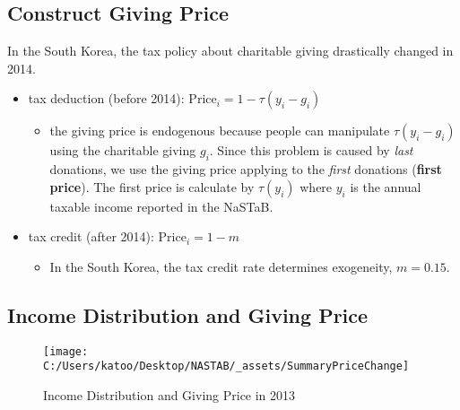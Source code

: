 \documentclass[ review  , 3p ]{elsarticle}
\providecommand{\tightlist}{%
  \setlength{\itemsep}{0pt}\setlength{\parskip}{0pt}}
\begin{document}
  \hypertarget{construct-giving-price}{%
  \subsection{Construct Giving Price}\label{construct-giving-price}}

  In the South Korea, the tax policy about charitable giving drastically changed in 2014.

  \begin{itemize}
  \tightlist
  \item
    tax deduction (before 2014): \(\text{Price}_i = 1 - \tau(y_i - g_i)\)

    \begin{itemize}
    \tightlist
    \item
      the giving price is endogenous because people can manipulate \(\tau(y_i - g_i)\) using the charitable giving \(g_i\). Since this problem is caused by \emph{last} donations, we use the giving price applying to the \emph{first} donations (\textbf{first price}). The first price is calculate by \(\tau(y_i)\) where \(y_i\) is the annual taxable income reported in the NaSTaB.
    \end{itemize}
  \item
    tax credit (after 2014): \(\text{Price}_i = 1 - m\)

    \begin{itemize}
    \tightlist
    \item
      In the South Korea, the tax credit rate determines exogeneity, \(m = 0.15\).
    \end{itemize}
  \end{itemize}

  \hypertarget{income-distribution-and-giving-price}{%
  \subsection{Income Distribution and Giving Price}\label{income-distribution-and-giving-price}}

  \begin{figure}

  {\centering \texttt{[image: C:/Users/katoo/Desktop/NASTAB/\_assets/SummaryPriceChange]} 

  }

  \caption{Income Distribution and Giving Price in 2013}\label{fig:unnamed-chunk-2}
  \end{figure}

  \clearpage
\end{document}
